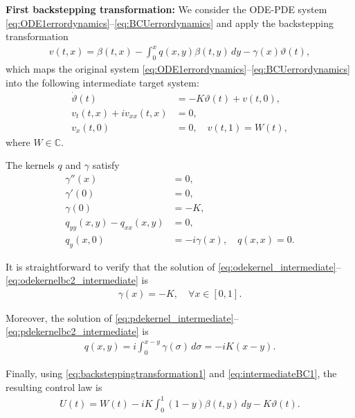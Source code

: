 \documentclass[letterpaper, 10 pt, conference]{ieeeconf}  %
\begin{document}
\textbf{First backstepping transformation:} We consider the ODE-PDE system \eqref{eq:ODE1errordynamics}--\eqref{eq:BCUerrordynamics} and apply the backstepping transformation
\begin{align}
    v(t,x) = \beta(t,x) - \int_{0}^{x} q(x,y) \beta(t,y) \, dy - \gamma(x) \vartheta(t), \label{eq:backsteppingtransformation1}
\end{align}
\noindent which maps the original system \eqref{eq:ODE1errordynamics}--\eqref{eq:BCUerrordynamics} into the following intermediate target system:
\begin{align}
    \dot{\vartheta}(t) &= -K \vartheta(t) + v(t,0), \label{eq:intermediateODE} \\
    v_{t}(t,x) +i v_{xx}(t,x)&= 0, \label{eq:intermediatePDE} \\
    v_{x}(t,0) &= 0, \quad v(t,1) = W(t), \label{eq:intermediateBC1}
\end{align}
\noindent where $W \in \mathbb{C}$.

The kernels $q$ and $\gamma$ satisfy
\begin{align}
    \gamma''(x) &= 0, \label{eq:odekernel_intermediate} \\
    \gamma'(0) &= 0, \\ 
    \gamma(0) &= -K, \label{eq:odekernelbc2_intermediate} \\
    q_{yy}(x,y) - q_{xx}(x,y) &= 0, \label{eq:pdekernel_intermediate} \\
    q_{y}(x,0) &= -i \gamma(x), \quad q(x,x) = 0. \label{eq:pdekernelbc2_intermediate}
\end{align}

It is straightforward to verify that the solution of \eqref{eq:odekernel_intermediate}--\eqref{eq:odekernelbc2_intermediate} is
\begin{align}
    \gamma(x) = -K, \quad \forall x \in [0,1].
\end{align}

Moreover, the solution of \eqref{eq:pdekernel_intermediate}--\eqref{eq:pdekernelbc2_intermediate} is
\begin{align}
    q(x,y) = i \int_{0}^{x-y} \gamma(\sigma) \, d\sigma = -i K (x-y). \label{eq:solutionkernelpde_intermediate}
\end{align}

Finally, using \eqref{eq:backsteppingtransformation1} and \eqref{eq:intermediateBC1}, the resulting control law is
\begin{align}
    U(t) = W(t) - i K \int_{0}^{1} (1-y) \beta(t,y) \, dy - K \vartheta(t). \label{eq:controller_schrodinger}
\end{align}
\end{document}
